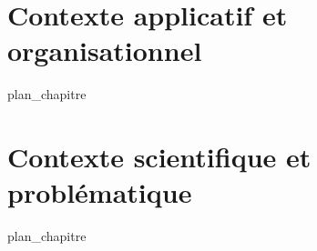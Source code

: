 %
\chapter{Contexte applicatif et organisationnel}
\label{chap:1}
{plan_chapitre}
%
\chapter{Contexte scientifique et problématique}
\label{chap:2}
{plan_chapitre}
%
%
